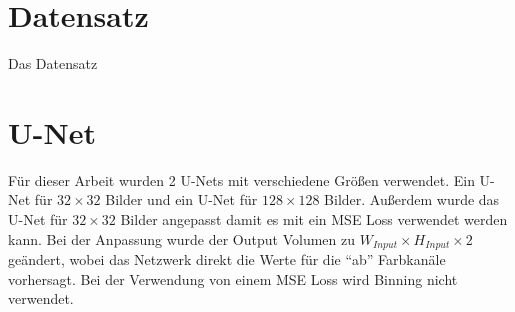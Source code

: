 \section{Datensatz}
Das Datensatz

\section{U-Net}
Für dieser Arbeit wurden 2 U-Nets mit verschiedene Größen verwendet. Ein U-Net für $ 32 \times 32 $ Bilder und ein U-Net für $ 128 \times 128 $ 
Bilder. Außerdem wurde das U-Net für $ 32 \times 32 $ Bilder angepasst damit es mit ein MSE Loss verwendet werden kann. Bei der Anpassung wurde
der Output Volumen zu $ W_{Input} \times H_{Input} \times 2 $ geändert, wobei das Netzwerk direkt die Werte für die ``ab'' Farbkanäle vorhersagt.
Bei der Verwendung von einem MSE Loss wird Binning nicht verwendet.

